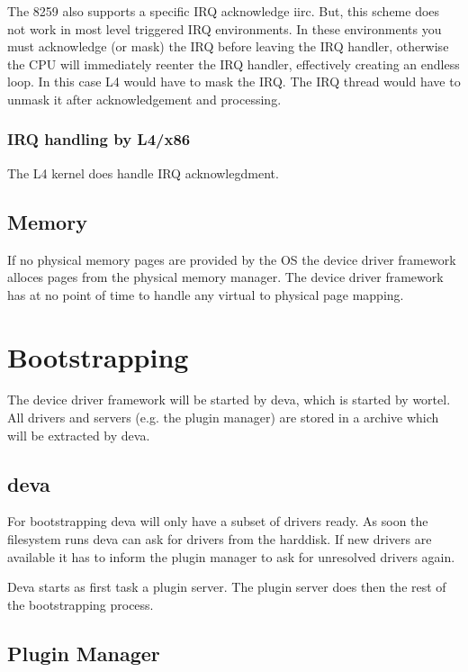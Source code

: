 The 8259 also supports a specific IRQ acknowledge iirc. But, this
scheme does not work in most level triggered IRQ environments. In
these environments you must acknowledge (or mask) the IRQ before
leaving the IRQ handler, otherwise the CPU will immediately reenter
the IRQ handler, effectively creating an endless loop. In this case L4
would have to mask the IRQ. The IRQ thread would have to unmask it
after acknowledgement and processing.

\subsubsection{IRQ handling by L4/x86}

The L4 kernel does handle IRQ acknowlegdment. 

\subsection{Memory}

If no physical memory pages are provided by the OS the device driver
framework alloces pages from the physical memory manager.  The device
driver framework has at no point of time to handle any virtual to
physical page mapping.


\section{Bootstrapping}

The device driver framework will be started by deva, which is started
by wortel.  All drivers and servers (e.g. the plugin manager) are
stored in a archive which will be extracted by deva.

\subsection{deva}

For bootstrapping deva will only have a subset of drivers ready.  
As soon the filesystem runs deva can ask for drivers from the harddisk. 
If new drivers are available it has to inform the plugin manager to ask
for unresolved drivers again.

Deva starts as first task a plugin server.  The plugin server does
then the rest of the bootstrapping process.

\subsection{Plugin Manager}

